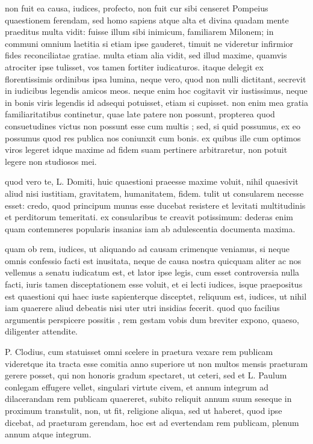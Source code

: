  non fuit ea causa, iudices, profecto, non fuit cur sibi censeret Pompeius quaestionem ferendam, sed homo sapiens atque alta et divina quadam mente praeditus multa vidit: fuisse illum sibi inimicum, familiarem Milonem; in communi omnium laetitia si etiam ipse gauderet, timuit ne videretur infirmior fides reconciliatae gratiae. multa etiam alia vidit, sed illud maxime, quamvis atrociter ipse tulisset, vos tamen fortiter iudicaturos. itaque delegit ex florentissimis ordinibus ipsa lumina, neque vero, quod non nulli dictitant, secrevit in iudicibus legendis amicos meos. neque enim hoc cogitavit vir iustissimus, neque in bonis viris legendis id adsequi potuisset, etiam si cupisset. non enim mea gratia familiaritatibus continetur, quae late patere non possunt, propterea quod consuetudines victus non possunt esse cum multis ; sed, si quid possumus, ex eo possumus quod res publica nos coniunxit cum bonis. ex quibus ille cum optimos viros legeret idque maxime ad fidem suam pertinere arbitraretur, non potuit legere non studiosos mei.

 quod vero te, L. Domiti, huic quaestioni praeesse maxime voluit, nihil quaesivit aliud nisi iustitiam, gravitatem, humanitatem, fidem. tulit ut consularem necesse esset: credo, quod principum munus esse ducebat resistere et levitati multitudinis et perditorum temeritati. ex consularibus te creavit potissimum: dederas enim quam contemneres popularis insanias iam ab adulescentia documenta maxima.

 quam ob rem, iudices, ut aliquando ad causam crimenque veniamus, si neque omnis confessio facti est inusitata, neque de causa nostra quicquam aliter ac nos vellemus a senatu iudicatum est, et lator ipse legis, cum esset controversia nulla facti, iuris tamen disceptationem esse voluit, et ei lecti iudices, isque praepositus est quaestioni qui haec iuste sapienterque disceptet, reliquum est, iudices, ut nihil iam quaerere aliud debeatis nisi uter utri insidias fecerit. quod quo facilius argumentis perspicere possitis , rem gestam vobis dum breviter expono, quaeso, diligenter attendite.

 P. Clodius, cum statuisset omni scelere in praetura vexare rem publicam videretque ita tracta esse comitia anno superiore ut non multos mensis praeturam gerere posset, qui non honoris gradum spectaret, ut ceteri, sed et L. Paulum conlegam effugere vellet, singulari virtute civem, et annum integrum ad dilacerandam rem publicam quaereret, subito reliquit annum suum seseque in proximum transtulit, non, ut fit, religione aliqua, sed ut haberet, quod ipse dicebat, ad praeturam gerendam, hoc est ad evertendam rem publicam, plenum annum atque integrum.

